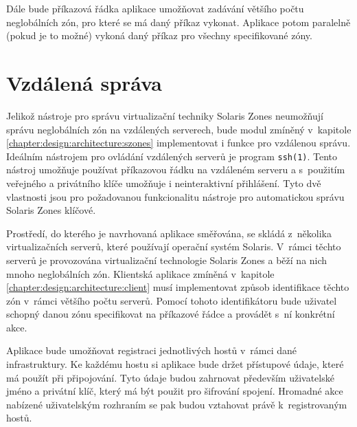 Dále bude příkazová řádka aplikace umožňovat zadávání většího počtu neglobálních zón, pro které se má daný příkaz vykonat. Aplikace
potom paralelně (pokud je to možné) vykoná daný příkaz pro všechny specifikované zóny.
\section{Vzdálená správa}
\label{chapter:design:remote}
Jelikož nástroje pro správu virtualizační techniky Solaris Zones neumožňují správu neglobálních zón na vzdálených serverech,
bude modul zmíněný v~kapitole \ref{chapter:design:architecture:szones} implementovat i funkce pro vzdálenou správu. Ideálním
nástrojem pro ovládání vzdálených serverů je program \verb|ssh(1)|. Tento nástroj umožňuje používat příkazovou řádku na 
vzdáleném serveru a s~použitím veřejného a privátního klíče umožňuje i neinteraktivní přihlášení. Tyto dvě vlastnosti jsou
pro požadovanou funkcionalitu nástroje pro automatickou správu Solaris Zones klíčové.

Prostředí, do kterého je navrhovaná aplikace směřována, se skládá z~několika virtualizačních serverů, které používají operační
systém Solaris. V~rámci těchto serverů je provozována virtualizační technologie Solaris Zones a běží na nich mnoho neglobálních
zón. Klientská aplikace zmíněná v~kapitole \ref{chapter:design:architecture:client} musí implementovat způsob identifikace
těchto zón v~rámci většího počtu serverů. Pomocí tohoto identifikátoru bude uživatel schopný danou zónu specifikovat na příkazové
řádce a provádět s~ní konkrétní akce.

Aplikace bude umožňovat registraci jednotlivých hostů v~rámci dané infrastruktury. Ke každému hostu si aplikace
bude držet přístupové údaje, které má použít při připojování. Tyto údaje budou zahrnovat především uživatelské jméno a 
privátní klíč, který má být použit pro šifrování spojení. Hromadné akce nabízené uživatelským rozhraním se pak budou vztahovat
právě k~registrovaným hostů.
